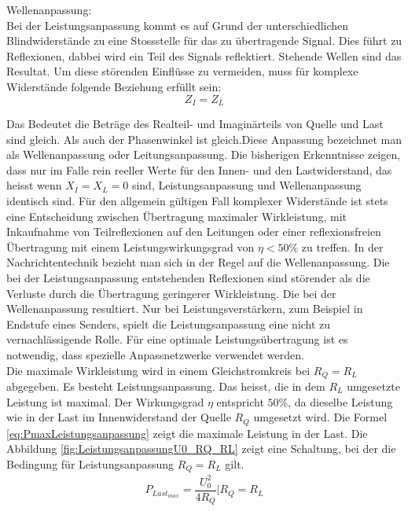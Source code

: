 Wellenanpassung: \\
Bei der Leistungsanpassung kommt es auf Grund der unterschiedlichen Blindwiderstände zu eine Stossstelle für das zu übertragende Signal. Dies führt zu Reflexionen, dabbei wird  ein Teil des Signals reflektiert. Stehende Wellen sind das Resultat. Um diese störenden Einflüsse zu vermeiden, muss für komplexe Widerstände folgende Beziehung erfüllt sein:
\[Z_{I} = Z_{L}\]

Das Bedeutet die Beträge des Realteil- und Imaginärteils von Quelle und Last sind gleich. Als auch der Phasenwinkel ist gleich.Diese Anpassung bezeichnet man als Wellenanpassung oder Leitungsanpassung. Die bisherigen Erkenntnisse zeigen, dass nur im Falle rein reeller Werte für den Innen- und den  Lastwiderstand, das heisst wenn $X_I = X_L = 0$ sind, Leistungsanpassung und Wellenanpassung identisch sind. Für den allgemein gültigen Fall komplexer Widerstände ist stets eine Entscheidung zwischen Übertragung maximaler Wirkleistung,  mit Inkaufnahme von Teilreflexionen auf den Leitungen oder einer reflexionsfreien Übertragung mit einem Leistungswirkungsgrad von $\eta <50 \%$ zu treffen. In der Nachrichtentechnik bezieht man sich in der Regel auf die Wellenanpassung. Die bei der Leistungsanpassung entstehenden Reflexionen  sind störender als die Verluste durch die Übertragung geringerer Wirkleistung. Die bei der Wellenanpassung resultiert. Nur bei Leistungsverstärkern, zum Beispiel in Endstufe eines Senders, spielt die Leistungsanpassung eine nicht zu vernachlässigende Rolle. Für eine optimale Leistungsübertragung ist es notwendig, dass spezielle Anpassnetzwerke verwendet werden. \\

Die maximale Wirkleistung wird in einem Gleichstromkreis bei $R_Q = R_L$ abgegeben. Es besteht Leistungsanpassung. Das heisst, die in dem $R_L$ umgesetzte Leistung ist maximal. Der Wirkungsgrad $\eta$ entspricht $50\%$, da dieselbe Leistung wie in der Last im Innenwiderstand der Quelle $R_Q$ umgesetzt wird. Die Formel \ref{eq:PmaxLeistungsanpassung} zeigt die maximale Leistung in der Last. Die Abbildung \ref{fig:LeistungsanpassungU0_RQ_RL} zeigt eine Schaltung, bei der die Bedingung für Leistungsanpassung $R_Q = R_L$ gilt.
\begin{eqnarray}\label{eq:PmaxLeistungsanpassung}
P_{Last_{max}}=\dfrac{U_{0}^2}{4R_Q} | R_Q=R_L
\end{eqnarray}

